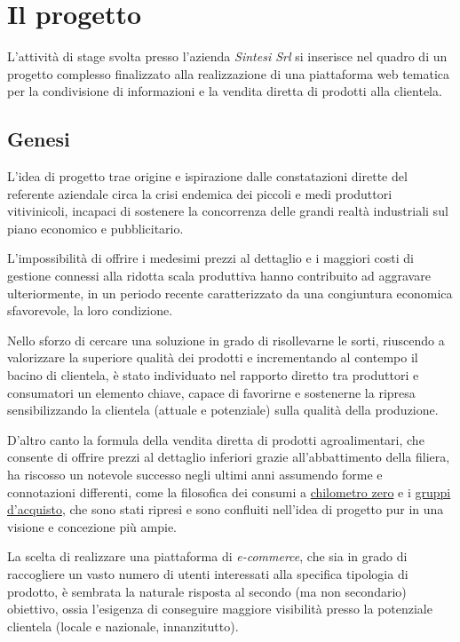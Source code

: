 \chapter{Il progetto}
\label{ch:tesi:progetto}
L'attività di stage svolta presso l'azienda \textit{Sintesi Srl} si inserisce nel quadro di un progetto complesso finalizzato alla realizzazione di una piattaforma web tematica per la condivisione di informazioni e la vendita diretta di prodotti alla clientela.

\section{Genesi}
\label{sec:progetto:genesi}
L'idea di progetto trae origine e ispirazione dalle constatazioni dirette del referente aziendale circa la crisi endemica dei piccoli e medi produttori vitivinicoli, incapaci di sostenere la concorrenza delle grandi realtà industriali sul piano economico e pubblicitario.

L'impossibilità di offrire i medesimi prezzi al dettaglio e i maggiori costi di gestione connessi alla ridotta scala produttiva hanno contribuito ad aggravare ulteriormente, in un periodo recente caratterizzato da una congiuntura economica sfavorevole, la loro condizione.

Nello sforzo di cercare una soluzione in grado di risollevarne le sorti, riuscendo a valorizzare la superiore qualità dei prodotti e incrementando al contempo il bacino di clientela, è stato individuato nel rapporto diretto tra produttori e consumatori un elemento chiave, capace di favorirne e sostenerne la ripresa sensibilizzando la clientela (attuale e potenziale) sulla qualità della produzione.

D'altro canto la formula della vendita diretta di prodotti agroalimentari, che consente di offrire prezzi al dettaglio inferiori grazie all'abbattimento della filiera, ha riscosso un notevole successo negli ultimi anni assumendo forme e connotazioni differenti, come la filosofica dei consumi a \underline{chilometro zero} e i \underline{gruppi d'acquisto}, che sono stati ripresi e sono confluiti nell'idea di progetto pur in una visione e concezione più ampie.

La scelta di realizzare una piattaforma di \textit{e-commerce}, che sia in grado di raccogliere un vasto numero di utenti interessati alla specifica tipologia di prodotto, è sembrata la naturale risposta al secondo (ma non secondario) obiettivo, ossia l'esigenza di conseguire maggiore visibilità presso la potenziale clientela (locale e nazionale, innanzitutto).

